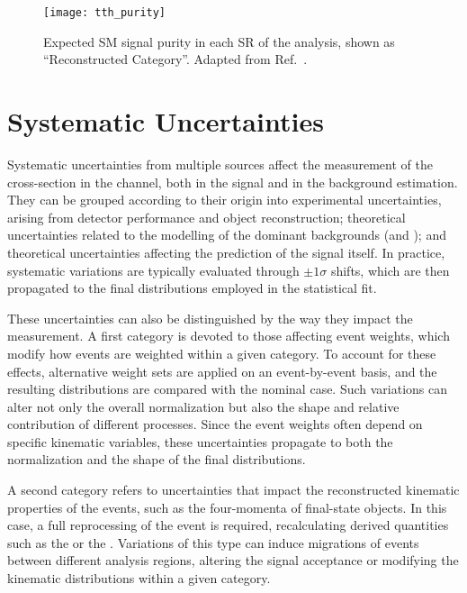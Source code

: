 \begin{figure}[htbp]
  \centering
  \texttt{[image: tth\_purity]}
  \caption{Expected SM \ttHtt signal purity in each SR of the analysis, shown as ``Reconstructed Category''. Adapted from Ref.~\cite{differential_htautau}.}
  \label{fig:tth_purity}
\end{figure}

\FloatBarrier
\section{Systematic Uncertainties}
\label{sec:tth_systematics}

Systematic uncertainties from multiple sources affect the measurement of the \ttH cross-section in the \tauhadhad channel, both in the signal and in the background estimation. They can be grouped according to their origin into experimental uncertainties, arising from detector performance and object reconstruction; theoretical uncertainties related to the modelling of the dominant backgrounds (\ttbar and \ztautau); and theoretical uncertainties affecting the prediction of the \ttH signal itself.
In practice, systematic variations are typically evaluated through $\pm 1\sigma$ shifts, which are then propagated to the final distributions employed in the statistical fit.  

These uncertainties can also be distinguished by the way they impact the measurement. A first category is devoted to those affecting event weights, which modify how events are weighted within a given category. To account for these effects, alternative weight sets are applied on an event-by-event basis, and the resulting distributions are compared with the nominal case. Such variations can alter not only the overall normalization but also the shape and relative contribution of different processes. Since the event weights often depend on specific kinematic variables, these uncertainties propagate to both the normalization and the shape of the final distributions.  

A second category refers to uncertainties that impact the reconstructed kinematic properties of the events, such as the four-momenta of final-state objects. In this case, a full reprocessing of the event is required, recalculating derived quantities such as the \etmiss or the \mtt. Variations of this type can induce migrations of events between different analysis regions, altering the signal acceptance or modifying the kinematic distributions within a given category.  

